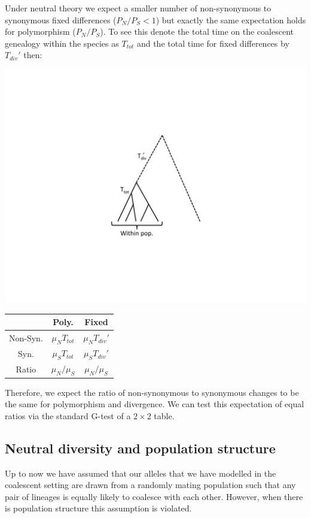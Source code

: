 Under neutral theory we expect a smaller number of non-synonymous to
synonymous fixed differences ($P_N/P_S < 1$) but exactly the same
expectation holds for polymorphism
($P_N/P_S$). To see this denote the total time on the coalescent genealogy within the species as
$T_{tot}$ and the total time for fixed differences by $T_{div}'$ then:

\begin{marginfigure}
\begin{center}
\includegraphics[width=0.8 \textwidth]{figures/Coalescent/MK_tree.pdf}
\end{center}
\caption{ } \label{fig:MK_tree}
\end{marginfigure}

\begin{center}
\begin{tabular}{ccc}
 & Poly. & Fixed  \\
 \hline
Non-Syn. &    $\mu_N T_{tot}$  &   $\mu_N  T_{div}'$ \\
Syn. &    $\mu_S T_{tot}$   &     $\mu_S  T_{div}'$  \\
Ratio & $\mu_N/\mu_S$  & $\mu_N/\mu_S$
\end{tabular}
\end{center}
Therefore, we expect the ratio of non-synonymous to synonymous changes
to be the same for polymorphism and divergence. We can test this expectation of equal ratios via the standard G-test of a $2
\times 2$ table.

\subsection{Neutral diversity and population structure}
Up to now we have assumed that our alleles that we have modelled in the
coalescent setting are drawn from a randomly mating population such
that any pair of lineages is equally likely to coalesce with each
other. However, when there is population structure this assumption is
violated. \\

